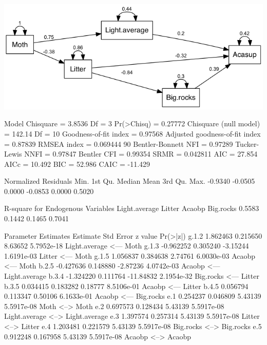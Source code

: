 \documentclass[12pt]{article}
\begin{document}
\includegraphics{semPathAcasup.png}

\pagebreak

\begin{Schunk}
\begin{Soutput}
 Model Chisquare =  3.8536   Df =  3 Pr(>Chisq) = 0.27772
 Chisquare (null model) =  142.14   Df =  10
 Goodness-of-fit index =  0.97568
 Adjusted goodness-of-fit index =  0.87839
 RMSEA index =  0.069444   90%
 Bentler-Bonnett NFI =  0.97289
 Tucker-Lewis NNFI =  0.97847
 Bentler CFI =  0.99354
 SRMR =  0.042811
 AIC =  27.854
 AICc =  10.492
 BIC =  52.986
 CAIC =  -11.429

 Normalized Residuals
   Min. 1st Qu.  Median    Mean 3rd Qu.    Max. 
-0.9340 -0.0505  0.0000 -0.0853  0.0000  0.5020 

 R-square for Endogenous Variables
Light.average        Litter        Acaobp     Big.rocks 
       0.5583        0.1442        0.1465        0.7041 

 Parameter Estimates
      Estimate  Std Error z value   Pr(>|z|)                                   
g.1.2  1.862463 0.215650    8.63652 5.7952e-18 Light.average <--- Moth         
g.1.3 -0.962252 0.305240   -3.15244 1.6191e-03 Litter <--- Moth                
g.1.5  1.056837 0.384638    2.74761 6.0030e-03 Acaobp <--- Moth                
b.2.5 -0.427636 0.148880   -2.87236 4.0742e-03 Acaobp <--- Light.average       
b.3.4 -1.324220 0.111764  -11.84832 2.1954e-32 Big.rocks <--- Litter           
b.3.5  0.034415 0.183282    0.18777 8.5106e-01 Acaobp <--- Litter              
b.4.5  0.056794 0.113347    0.50106 6.1633e-01 Acaobp <--- Big.rocks           
e.1    0.254237 0.046809    5.43139 5.5917e-08 Moth <--> Moth                  
e.2    0.697573 0.128434    5.43139 5.5917e-08 Light.average <--> Light.average
e.3    1.397574 0.257314    5.43139 5.5917e-08 Litter <--> Litter              
e.4    1.203481 0.221579    5.43139 5.5917e-08 Big.rocks <--> Big.rocks        
e.5    0.912248 0.167958    5.43139 5.5917e-08 Acaobp <--> Acaobp              


\end{Soutput}
\end{Schunk}
\end{document}
